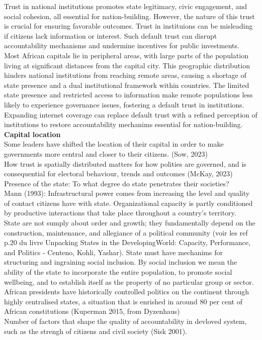 \documentclass[11pt]{article}
\theoremstyle{plain}
\theoremstyle{plain}
\begin{document}
Trust in national institutions promotes state legitimacy, civic engagement, and social cohesion, all essential for nation-building. However, the nature of this trust is crucial for ensuring favorable outcomes. Trust in instituions can be misleading if citizens lack information or interest. Such default trust can disrupt accountability mechanisms and undermine incentives for public investments.\\

Most African capitals lie in peripheral areas, with large parts of the population living at significant distances from the capital city. This geographic distribution hinders national institutions from reaching remote areas, causing a shortage of state presence and a dual institutional framework within countries. The limited state presence and restricted access to information make remote populations less likely to experience governance issues, fostering a default trust in institutions.\\

Expanding internet coverage can replace default trust with a refined perception of institutions to restore accountability mechanims essential for nation-building.\\

\textbf{Capital location}\\

Some leaders have shifted the location of their capital in order to make governments more central and closer to their citizens. (Sow, 2023)\\
How trust is spatially distributed matters for how polities are governed, and is consequential for electoral behaviour, trends and outcomes (McKay, 2023)\\
Presence of the state: To what degree do state penetrates their societies?\\
Mann (1993): Infrastructural power comes from increasing the level and quality of contact citizens have with state. Organizational capacity is partly conditioned by productive interactions that take place throughout a country's territory.\\

State are not sumply about order and growth; they fundamentally depend on the construction, maintenance, and allegiance of a political community (voir les ref p.20 du livre Unpacking States in the DevelopingWorld: Capacity, Performance, and Politics - Centeno, Kohli,
Yashar). State must have mechanims for structuring and ingraining social inclusion. By social inclusion we mean the ability of the state to incorporate the entire population, to promote social wellbeing, and to establish itself as the property of no particular group or sector.\\

African presidents have historically controlled politics on the continent through highly centralised states, a situation that is enrished in around 80 per cent of African constitutions (Kuperman 2015, from Dyzenhaus)\\
Number of factors that shape the quality of accountability in devloved system, such as the strengh of citizens and civil society (Sisk 2001).\\
\end{document}
